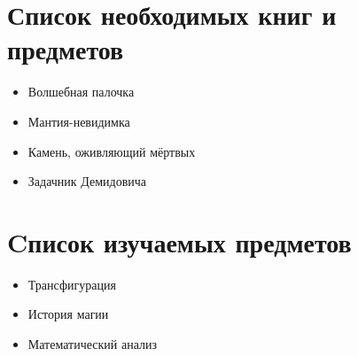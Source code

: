 \documentclass[12pt,a4paper]{book}
\begin{document}
\newpage

\section {Список необходимых книг и предметов}
\begin{itemize}
\item Волшебная палочка
\item Мантия-невидимка
\item Камень, оживляющий мёртвых
\item Задачник Демидовича 
\end{itemize}

\newpage

\section {Cписок изучаемых предметов}

\begin{itemize}
\item Трансфигурация
\item  История магии
\item Математический анализ

\end{itemize}
\end{document}
